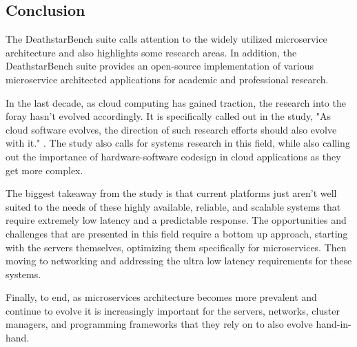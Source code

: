 \documentclass[12pt]{report}
\begin{document}
\subsection*{Conclusion}
The DeathstarBench suite calls attention to the widely utilized microservice architecture and also highlights some research areas. In addition, the DeathstarBench suite provides an open-source implementation of various microservice architected applications for academic and professional research.

In the last decade, as cloud computing has gained traction, the research into the foray hasn't evolved accordingly. It is specifically called out in the study, "As cloud software evolves, the direction of such research efforts should also evolve with it." \cite{article}. The study also calls for systems research in this field, while also calling out the importance of hardware-software codesign in cloud applications as they get more complex. 

The biggest takeaway from the study is that current platforms just aren't well suited to the needs of these highly available, reliable, and scalable systems that require extremely low latency and a predictable response. The opportunities and challenges that are presented in this field require a bottom up approach, starting with the servers themselves, optimizing them specifically for microservices. Then moving to networking and addressing the ultra low latency requirements for these systems. 

Finally, to end, as microservices architecture becomes more prevalent and continue to evolve it is increasingly important for the servers, networks, cluster managers, and programming frameworks that they rely on to also evolve hand-in-hand.



\listoffigures


\end{document}
